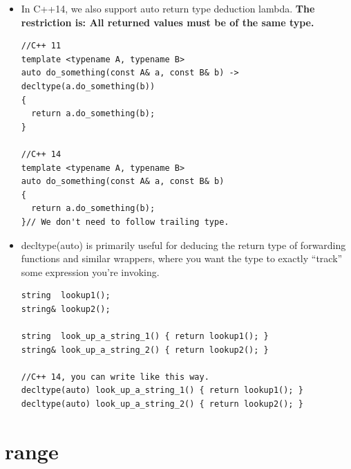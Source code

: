 \documentclass[a4paper,11pt,twoside]{book}
\begin{document}
\begin{itemize}
\begin{lstlisting}
\begin{itemize}
		\item In C++14, we support all the auto return type. 

\begin{lstlisting}
// C++14
auto f()              { return foo() * 42; } // ok, deduces "-> some_type"

auto g() {                                // ok, deduces "-> some_type"
    while( something() ) {
        if( expr ) {
            return foo() * 42;            // with arbitrary control flow
        }
    }
    return bar.baz(84);                   // & multiple returns
}              
\end{lstlisting}
		\item In C++14, we also support auto return type deduction lambda. \textbf{The restriction is: All returned values must be of the same type.}

\begin{lstlisting}
//C++ 11
template <typename A, typename B>
auto do_something(const A& a, const B& b) -> decltype(a.do_something(b))
{
  return a.do_something(b);
}

//C++ 14
template <typename A, typename B>
auto do_something(const A& a, const B& b)
{
  return a.do_something(b);
}// We don't need to follow trailing type.
\end{lstlisting}
		\item decltype(auto) is primarily useful for deducing the return type of forwarding functions and similar wrappers, where you want the type to exactly “track” some expression you’re invoking.
\begin{lstlisting}
string  lookup1();
string& lookup2();

string  look_up_a_string_1() { return lookup1(); }
string& look_up_a_string_2() { return lookup2(); }

//C++ 14, you can write like this way.
decltype(auto) look_up_a_string_1() { return lookup1(); }
decltype(auto) look_up_a_string_2() { return lookup2(); }
\end{lstlisting}

\end{itemize}

\section{range}
\end{document}
